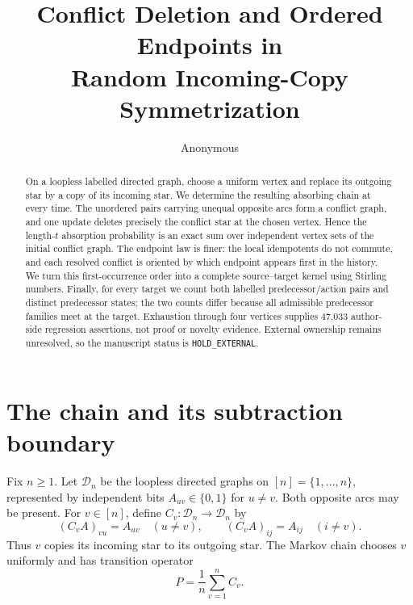 \documentclass[a4paper,10pt]{amsart}
\title[Random incoming-copy symmetrization]{Conflict Deletion and Ordered Endpoints in\\
Random Incoming-Copy Symmetrization}
\author{Anonymous}
\date{}
\theoremstyle{remark}
\newcommand{\Dn}{\mathcal D_n}
\begin{document}
\begin{abstract}
On a loopless labelled directed graph, choose a uniform vertex and replace its
outgoing star by a copy of its incoming star.  We determine the resulting
absorbing chain at every time.  The unordered pairs carrying unequal opposite
arcs form a conflict graph, and one update deletes precisely the conflict star
at the chosen vertex.  Hence the length-$t$ absorption probability is an exact
sum over independent vertex sets of the initial conflict graph.  The endpoint
law is finer: the local idempotents do not commute, and each resolved conflict
is oriented by which endpoint appears first in the history.  We turn this
first-occurrence order into a complete source--target kernel using Stirling
numbers.  Finally, for every target we count both labelled predecessor/action
pairs and distinct predecessor states; the two counts differ because all
admissible predecessor families meet at the target.  Exhaustion through four
vertices supplies 47,033 author-side regression assertions, not proof or
novelty evidence.  External ownership remains unresolved, so the manuscript
status is \texttt{HOLD\_EXTERNAL}.
\end{abstract}

\maketitle

\section{The chain and its subtraction boundary}

Fix $n\geq1$.  Let $\Dn$ be the loopless directed graphs on
$[n]=\{1,\ldots,n\}$, represented by independent bits $A_{uv}\in\{0,1\}$
for $u\ne v$.  Both opposite arcs may be present.  For $v\in[n]$, define
$C_v:\Dn\to\Dn$ by
\begin{equation}\label{eq:update}
 (C_vA)_{vu}=A_{uv}\quad(u\ne v),\qquad
 (C_vA)_{ij}=A_{ij}\quad(i\ne v).
\end{equation}
Thus $v$ copies its incoming star to its outgoing star.  The Markov chain
chooses $v$ uniformly and has transition operator
\begin{equation}\label{eq:markov}
 P=\frac1n\sum_{v=1}^n C_v.
\end{equation}
\end{document}
